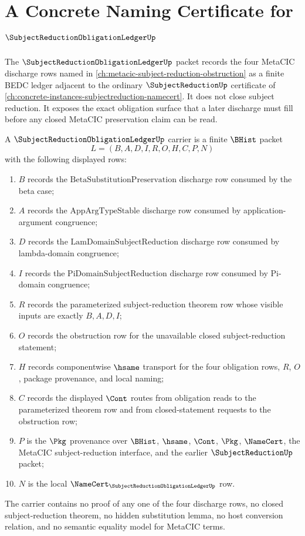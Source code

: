 \chapter{A Concrete Naming Certificate for $\SubjectReductionObligationLedgerUp$}
\label{ch:concrete-instances-subjectreductionobligationledger-namecert}

The $\SubjectReductionObligationLedgerUp$ packet records the four MetaCIC discharge rows named in \autoref{ch:metacic-subject-reduction-obstruction} as a finite BEDC ledger adjacent to the ordinary $\SubjectReductionUp$ certificate of \autoref{ch:concrete-instances-subjectreduction-namecert}. It does not close subject reduction. It exposes the exact obligation surface that a later discharge must fill before any closed MetaCIC preservation claim can be read.

\begin{definition}
\label{def:subject-reduction-obligation-ledger-carrier}
A $\SubjectReductionObligationLedgerUp$ carrier is a finite $\BHist$ packet
$$
L=(B,A,D,I,R,O,H,C,P,N)
$$
with the following displayed rows:
\begin{enumerate}
\item $B$ records the $\mathrm{BetaSubstitutionPreservation}$ discharge row consumed by the beta case;
\item $A$ records the $\mathrm{AppArgTypeStable}$ discharge row consumed by application-argument congruence;
\item $D$ records the $\mathrm{LamDomainSubjectReduction}$ discharge row consumed by lambda-domain congruence;
\item $I$ records the $\mathrm{PiDomainSubjectReduction}$ discharge row consumed by Pi-domain congruence;
\item $R$ records the parameterized subject-reduction theorem row whose visible inputs are exactly $B,A,D,I$;
\item $O$ records the obstruction row for the unavailable closed subject-reduction statement;
\item $H$ records componentwise $\hsame$ transport for the four obligation rows, $R$, $O$, package provenance, and local naming;
\item $C$ records the displayed $\Cont$ routes from obligation reads to the parameterized theorem row and from closed-statement requests to the obstruction row;
\item $P$ is the $\Pkg$ provenance over $\BHist$, $\hsame$, $\Cont$, $\Pkg$, $\NameCert$, the MetaCIC subject-reduction interface, and the earlier $\SubjectReductionUp$ packet;
\item $N$ is the local $\NameCert_{\SubjectReductionObligationLedgerUp}$ row.
\end{enumerate}
The carrier contains no proof of any one of the four discharge rows, no closed subject-reduction theorem, no hidden substitution lemma, no host conversion relation, and no semantic equality model for MetaCIC terms.
\end{definition}

